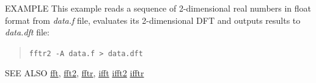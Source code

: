 \begin{qsection}{EXAMPLE}
This example reads a sequence of 2-dimensional real numbers in float format
from {\em data.f} file, evaluates its 2-dimensional DFT and outputs results to {\em 
data.dft} file:
\begin{quote}
  \verb!fftr2 -A data.f > data.dft!
\end{quote}
\end{qsection}

\begin{qsection}{SEE ALSO}
\hyperlink{fft}{fft},
\hyperlink{fft2}{fft2},
\hyperlink{fftr}{fftr},
\hyperlink{ifftr}{ifft}
\hyperlink{ifft2}{ifft2}
\hyperlink{ifftr}{ifftr}
\end{qsection}
